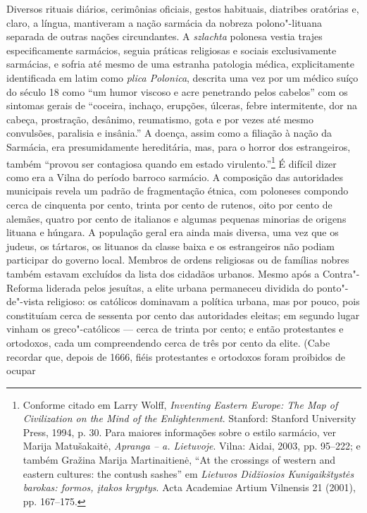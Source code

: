 Diversos rituais diários, cerimônias oficiais, gestos habituais,
diatribes oratórias e, claro, a língua, mantiveram a nação sarmácia da
nobreza polono"-lituana separada de outras nações circundantes. A
\textit{szlachta} polonesa vestia trajes especificamente sarmácios, seguia
práticas religiosas e sociais exclusivamente sarmácias, e sofria até
mesmo de uma estranha patologia médica, explicitamente identificada em
latim como \textit{plica Polonica}, descrita uma vez por um médico suíço
do século 18 como ``um humor viscoso e acre penetrando pelos cabelos''
com os sintomas gerais de ``coceira, inchaço, erupções, úlceras, febre
intermitente, dor na cabeça, prostração, desânimo, reumatismo, gota e
por vezes até mesmo convulsões, paralisia e insânia.'' A doença, assim
como a filiação à nação da Sarmácia, era presumidamente hereditária,
mas, para o horror dos estrangeiros, também ``provou ser contagiosa
quando em estado virulento.''\footnote{Conforme citado em Larry Wolff, \textit{Inventing Eastern Europe: The Map of Civilization on the Mind of the Enlightenment}. Stanford: Stanford University Press, 1994, p. 30. Para maiores informações sobre o estilo sarmácio, ver Marija Matušakaitė, \textit{Apranga -- a. Lietuvoje}. Vilna: Aidai, 2003, pp. 95--222; e também Gražina Marija Martinaitienė, ``At the crossings of western and eastern cultures: the contush sashes'' em \textit{Lietuvos Didžiosios Kunigaikštystės barokas: formos, įtakos kryptys}. Acta Academiae Artium Vilnensis 21 (2001), pp. 167--175.}
É difícil dizer como era a Vilna do período barroco sarmácio. A
composição das autoridades municipais revela um padrão de fragmentação
étnica, com poloneses compondo cerca de cinquenta por cento, trinta por
cento de rutenos, oito por cento de alemães, quatro por cento de
italianos e algumas pequenas minorias de origens lituana e húngara. A
população geral era ainda mais diversa, uma vez que os judeus, os
tártaros, os lituanos da classe baixa e os estrangeiros não podiam
participar do governo local. Membros de ordens religiosas ou de famílias
nobres também estavam excluídos da lista dos cidadãos urbanos. Mesmo
após a Contra"-Reforma liderada pelos jesuítas, a elite urbana permaneceu
dividida do ponto"-de"-vista religioso: os católicos dominavam a política
urbana, mas por pouco, pois constituíam cerca de sessenta por cento das
autoridades eleitas; em segundo lugar vinham os greco"-católicos --- cerca
de trinta por cento; e então protestantes e ortodoxos, cada um
compreendendo cerca de três por cento da elite. (Cabe recordar que,
depois de 1666, fiéis protestantes e ortodoxos foram proibidos de ocupar
